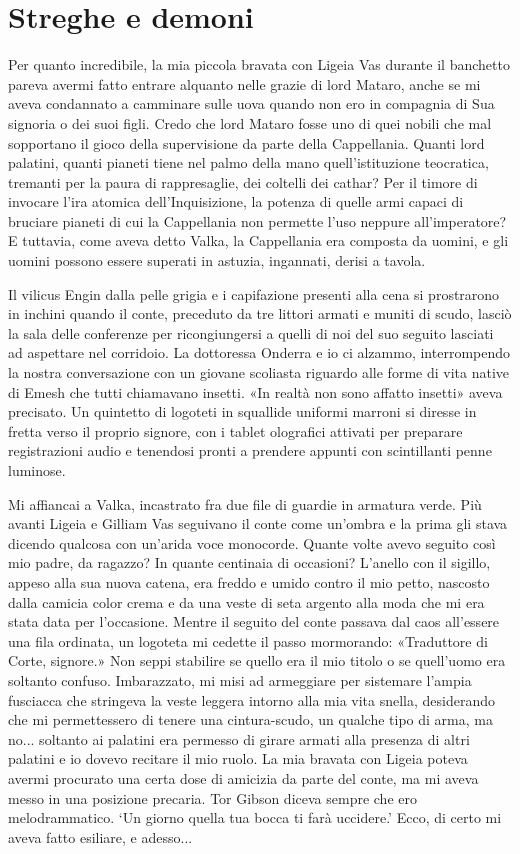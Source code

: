 \chapter{Streghe e demoni}

Per quanto incredibile, la mia piccola bravata con Ligeia Vas durante il
banchetto pareva avermi fatto entrare alquanto nelle grazie di lord
Mataro, anche se mi aveva condannato a camminare sulle uova quando non
ero in compagnia di Sua signoria o dei suoi figli. Credo che lord Mataro
fosse uno di quei nobili che mal sopportano il gioco della supervisione
da parte della Cappellania. Quanti lord palatini, quanti pianeti tiene
nel palmo della mano quell'istituzione teocratica, tremanti per la paura
di rappresaglie, dei coltelli dei cathar? Per il timore di invocare
l'ira atomica dell'Inquisizione, la potenza di quelle armi capaci di
bruciare pianeti di cui la Cappellania non permette l'uso neppure
all'imperatore? E tuttavia, come aveva detto Valka, la Cappellania era
composta da uomini, e gli uomini possono essere superati in astuzia,
ingannati, derisi a tavola.

Il vilicus Engin dalla pelle grigia e i capifazione presenti alla cena
si prostrarono in inchini quando il conte, preceduto da tre littori
armati e muniti di scudo, lasciò la sala delle conferenze per
ricongiungersi a quelli di noi del suo seguito lasciati ad aspettare nel
corridoio. La dottoressa Onderra e io ci alzammo, interrompendo la
nostra conversazione con un giovane scoliasta riguardo alle forme di
vita native di Emesh che tutti chiamavano insetti. «In realtà non sono
affatto insetti» aveva precisato. Un quintetto di logoteti in squallide
uniformi marroni si diresse in fretta verso il proprio signore, con i
tablet olografici attivati per preparare registrazioni audio e tenendosi
pronti a prendere appunti con scintillanti penne luminose.

Mi affiancai a Valka, incastrato fra due file di guardie in armatura
verde. Più avanti Ligeia e Gilliam Vas seguivano il conte come un'ombra
e la prima gli stava dicendo qualcosa con un'arida voce monocorde.
Quante volte avevo seguito così mio padre, da ragazzo? In quante
centinaia di occasioni? L'anello con il sigillo, appeso alla sua nuova
catena, era freddo e umido contro il mio petto, nascosto dalla camicia
color crema e da una veste di seta argento alla moda che mi era stata
data per l'occasione. Mentre il seguito del conte passava dal caos
all'essere una fila ordinata, un logoteta mi cedette il passo
mormorando: «Traduttore di Corte, signore.» Non seppi stabilire se
quello era il mio titolo o se quell'uomo era soltanto confuso.
Imbarazzato, mi misi ad armeggiare per sistemare l'ampia fusciacca che
stringeva la veste leggera intorno alla mia vita snella, desiderando che
mi permettessero di tenere una cintura-scudo, un qualche tipo di arma,
ma no... soltanto ai palatini era permesso di girare armati alla
presenza di altri palatini e io dovevo recitare il mio ruolo. La mia
bravata con Ligeia poteva avermi procurato una certa dose di amicizia da
parte del conte, ma mi aveva messo in una posizione precaria. Tor Gibson
diceva sempre che ero melodrammatico. `Un giorno quella tua bocca ti
farà uccidere.' Ecco, di certo mi aveva fatto esiliare, e adesso...

